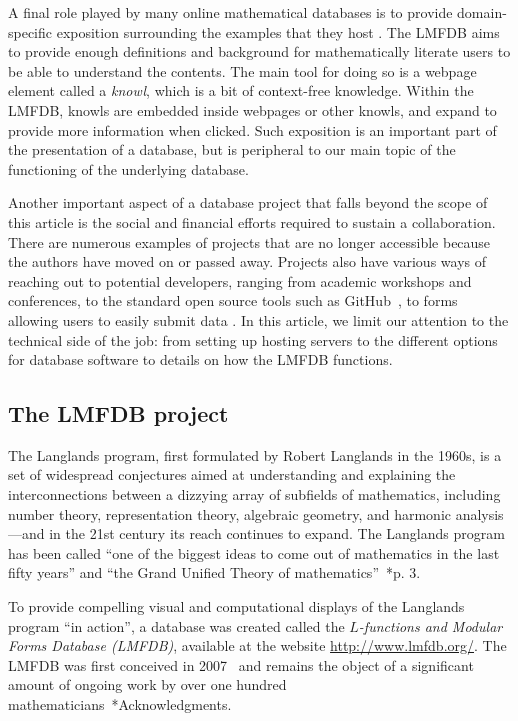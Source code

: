 \documentclass{amsart}
\begin{document}
A final role played by many online mathematical databases is to provide domain-specific exposition surrounding the examples that they host .
The LMFDB aims to provide enough definitions and background for mathematically literate users to be able to understand the contents.
The main tool for doing so is a webpage element called a \emph{knowl}, which is a bit of context-free knowledge.
Within the LMFDB, knowls are embedded inside webpages or other knowls, and expand to provide more information when clicked.
Such exposition is an important part of the presentation of a database, but is peripheral to our main topic of the functioning of the underlying database.

Another important aspect of a database project that falls beyond the scope of this article is the social and financial efforts required to sustain a collaboration.
There are numerous examples of projects that are no longer accessible because the authors have moved on or passed away.
Projects also have various ways of reaching out to potential developers, ranging from academic workshops and conferences, to the standard open source tools such as GitHub~\cite{github}, to forms allowing users to easily submit data .
In this article, we limit our attention to the technical side of the job: from setting up hosting servers to the different options for database software to details on how the LMFDB functions.

\subsection{The LMFDB project}
The Langlands program, first formulated by Robert Langlands in the 1960s, is a set of widespread conjectures aimed at understanding and explaining the interconnections between a dizzying array of subfields of mathematics, including number theory, representation theory, algebraic geometry, and harmonic analysis---and in the 21st century its reach continues to expand.
The Langlands program has been called ``one of the biggest ideas to come out of mathematics in the last fifty years'' and ``the Grand Unified Theory of mathematics''~\cite{frenkel}*{p. 3}.

To provide compelling visual and computational displays of the Langlands program ``in action'', a database was created called the \emph{$L$-functions and Modular Forms Database (LMFDB)}, available at the website \url{http://www.lmfdb.org/}.
The LMFDB was first conceived in 2007~\cite{cremona-16} and remains the object of a significant amount of ongoing work by over one hundred mathematicians~\cite{lmfdb}*{Acknowledgments}.
\end{document}
